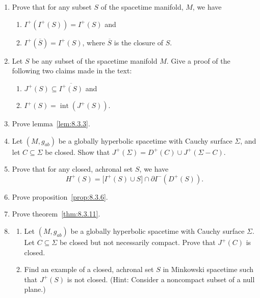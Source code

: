 
\chapterproblems

\begin{enumerate}[label=\arabic*.,leftmargin=*]
\item Prove that for any subset \(S\) of the spacetime manifold, \(M\), we have
  \begin{enumerate}[label=\alph*),leftmargin=2em]
  \item \(I^+(I^+(S))=I^+(S)\) and
  \item \(I^+(\overline S)=I^+(S)\), where \(\overline S\) is the closure of \(S\).
  \end{enumerate}

\item Let \(S\) be any subset of the spacetime manifold \(M\). Give a proof of the
following two claims made in the text:
  \begin{enumerate}[label=\alph*),leftmargin=2em]
  \item \(J^+(S)\subseteq\overline{I^+(S)}\) and
  \item \(I^+(S)=\operatorname{int}(J^+(S))\).
  \end{enumerate}

\item Prove lemma~\ref{lem:8.3.3}.

\item Let \((M,g_{ab})\) be a globally hyperbolic spacetime with Cauchy surface
\(\Sigma\), and let \(C\subseteq\Sigma\) be closed. Show that
\(J^+(\Sigma)=D^+(C)\cup J^+(\Sigma-C)\).

\item Prove that for any closed, achronal set \(S\), we have
\[
  H^+(S)=\bigl[I^+(S)\cup S\bigr]\cap\partial I^-(D^+(S)).
\]

\item Prove proposition~\ref{prop:8.3.6}.

\item Prove theorem~\ref{thm:8.3.11}.

\item
  \begin{enumerate}[label=\alph*),leftmargin=2em]
  \item Let \((M,g_{ab})\) be a globally hyperbolic spacetime with Cauchy surface
  \(\Sigma\). Let \(C\subseteq\Sigma\) be closed but not necessarily compact. Prove
  that \(J^+(C)\) is closed.
  \item Find an example of a closed, achronal set \(S\) in Minkowski spacetime such
  that \(J^+(S)\) is not closed. (Hint: Consider a noncompact subset of a null plane.)
  \end{enumerate}
\end{enumerate}

\setcounter{footnote}{\chaptereightpreviousfootnote}
\endgroup
